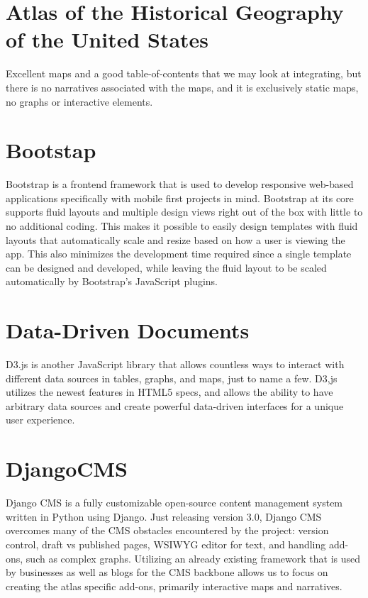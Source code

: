 \documentclass[12pt]{article}
\begin{document}
\section{Atlas of the Historical Geography of the United States~\cite{us-historical-atlas-2014}}

Excellent maps and a good table-of-contents that we may look at integrating, but there is no narratives associated with the maps, and it is exclusively static maps, no graphs or interactive elements.

\section{Bootstap~\cite{bootstrap-2014}}

Bootstrap is a frontend framework that is used to develop responsive web-based applications specifically with mobile first projects in mind.  Bootstrap at its core supports fluid layouts and multiple design views right out of the box with little to no additional coding.  This makes it possible to easily design templates with fluid layouts that automatically scale and resize based on how a user is viewing the app.  This also minimizes the development time required since a single
template can be designed and developed, while leaving the fluid layout to be scaled automatically by Bootstrap’s JavaScript plugins.

\section{Data-Driven Documents~\cite{d3js-2014}}

D3.js is another JavaScript library that allows countless ways to interact with different data sources in tables, graphs, and maps, just to name a few.  D3,js utilizes the newest features in HTML5 specs, and allows the ability to have arbitrary data sources and create powerful data-driven interfaces for a unique user experience.

\section{DjangoCMS~\cite{django-cms-2014}}

Django CMS is a fully customizable open-source content management system written in Python using Django. Just releasing version 3.0, Django CMS overcomes many of the CMS obstacles encountered by the project: version control, draft vs published pages, WSIWYG editor for text, and handling add-ons, such as complex graphs. Utilizing an already existing framework that is used by businesses as well as blogs for the CMS backbone allows us to focus on creating the atlas specific
add-ons, primarily interactive maps and narratives.
\end{document}
